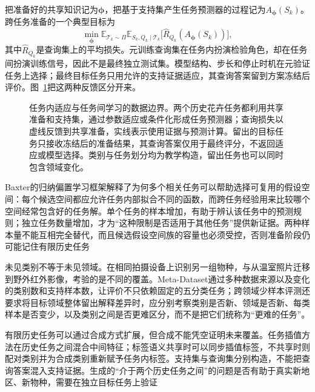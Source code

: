 把准备好的共享知识记为$\bm{\phi}$，把基于支持集产生任务预测器的过程记为$A_{\bm{\phi}}(S_k)$。跨任务准备的一个典型目标为
\begin{equation}
  \min_{\bm{\phi}}
  \mathbb E_{\mathcal T_k\sim\Pi}
  \mathbb E_{S_k,Q_k\mid\mathcal T_k}
  \bigl[\hat R_{Q_k}(A_{\bm{\phi}}(S_k))\bigr],
  \label{eq:ket-transfer-meta-objective}
\end{equation}
其中$\hat R_{Q_k}$是查询集上的平均损失。元训练查询集在任务内扮演检验角色，却在任务间扮演训练信号，因此不是最终独立测试集。模型结构、步长和停止时机在元验证任务上选择；最终目标任务只用允许的支持证据适应，其查询答案留到方案冻结后评价。图~\ref{fig:ket-transfer-data-boundaries}把这两种反馈区分开来。

\begin{figure}[htbp]
  \centering
  
  \caption{任务内适应与任务间学习的数据边界。两个历史花卉任务都利用共享准备和支持集，通过参数适应或条件化形成任务预测器；查询损失以虚线反馈到共享准备，实线表示使用证据与预测计算。留出的目标任务只接收冻结后的准备结果，其查询答案仅用于最终评分，不返回适应或模型选择。类别与任务划分均为教学构造，留出任务也可以同时包含领域变化。}
  \label{fig:ket-transfer-data-boundaries}
\end{figure}

Baxter的归纳偏置学习框架解释了为何多个相关任务可以帮助选择可复用的假设空间：每个候选空间都应允许任务内部拟合不同的函数，而跨任务经验用来比较哪个空间经常包含好的任务解。单个任务的样本增加，有助于辨认该任务中的预测规则；独立任务数量增加，才为“这种限制是否适用于其他任务”提供新证据。两种样本量不能互相完全替代，而且候选假设空间族的容量也必须受控，否则准备阶段仍可能记住有限历史任务

未见类别不等于未见领域。在相同拍摄设备上识别另一组物种，与从温室照片迁移到野外红外影像，考验的是不同的覆盖。Meta-Dataset通过多种数据来源以及变化的类别数和支持样本数，让评价不只依赖固定的五分类任务；跨领域少样本评测还要求将目标领域整体留出解释差异时，应分别考察类别是否新、领域是否新、每类样本是否变少，以及类别之间是否更难区分，而不是把它们统称为“更难的任务”。

有限历史任务可以通过合成方式扩展，但合成不能凭空证明未来覆盖。任务插值方法在历史任务之间混合中间特征；标签语义共享时可以同步插值标签，不共享时则配对类别并为合成类别重新赋予任务内标签。支持集与查询集分别构造，不能把查询答案混入支持证据。生成的“介于两个历史任务之间”的问题是否有助于真实新地区、新物种，需要在独立目标任务上验证

